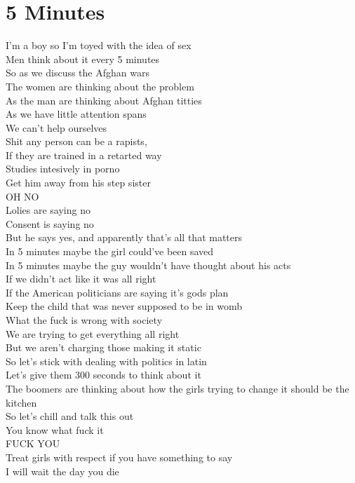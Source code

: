 \documentclass[12pt, b5paper, oneside]{book}
\begin{document}
\section{5 Minutes}
I'm a boy so I'm toyed with the idea of sex 
\\Men think about it every 5 minutes 
\\So as we discuss the Afghan wars 
\\The women are thinking about the problem 
\\As the man are thinking about Afghan titties 
\\As we have little attention spans 
\\We can't help ourselves 
\\Shit any person can be a rapists, 
\\If they are trained in a retarted way 
\\Studies intesively in porno
\\Get him away from his step sister 
\\OH NO
\\Lolies are saying no
\\Consent is saying no 
\\But he says yes, and apparently that's all that matters
\\In 5 minutes maybe the girl could've been saved
\\In 5 minutes maybe the guy wouldn't have thought about his acts
\\If we didn't act like it was all right 
\\If the American politicians are saying it's gods plan
\\Keep the child that was never supposed to be in womb
\\What the fuck is wrong with society
\\We are trying to get everything all right 
\\But we aren't charging those making it static 
\\So let's stick with dealing with politics in latin 
\\Let's give them 300 seconds to think about it 
\\The boomers are thinking about how the girls trying to change it should be the kitchen 
\\So let's chill and talk this out 
\\You know what fuck it 
\\FUCK YOU
\\Treat girls with respect if you have something to say 
\\I will wait the day you die 
\end{document}
